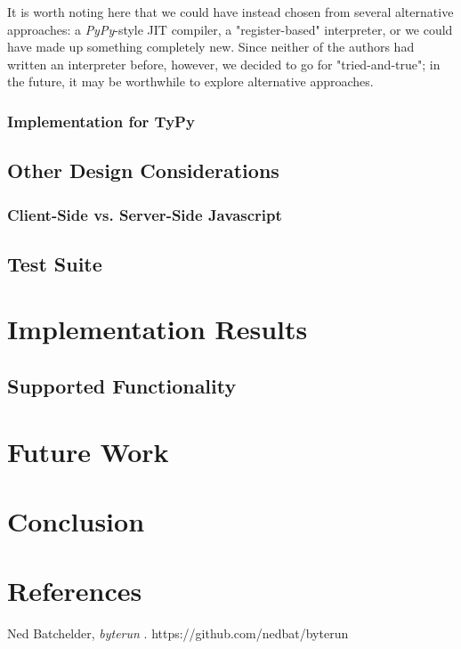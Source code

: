 \documentclass[10pt,a4paper]{article}
\begin{document}
It is worth noting here that we could have instead chosen from several alternative approaches: a \emph{PyPy}-style JIT compiler, a "register-based" interpreter, or we could have made up something completely new. Since neither of the authors had written an interpreter before, however, we decided to go for "tried-and-true"; in the future, it may be worthwhile to explore alternative approaches.



\subsubsection{Implementation for TyPy}


\subsection{Other Design Considerations}
\subsubsection{Client-Side vs. Server-Side Javascript}

\subsection{Test Suite}

\section{Implementation Results}
\subsection{Supported Functionality}


\section{Future Work}

\section{Conclusion}

\section{References} %

\begin{thebibliography}{9}

  Ned Batchelder,
  \emph{byterun }.
  https://github.com/nedbat/byterun


\end{thebibliography}
\end{document}
